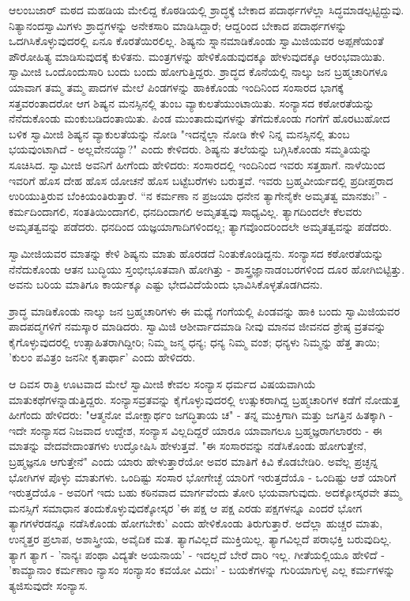ಆಲಂಬಜಾರ್ ಮಠದ ಮಹಡಿಯ ಮೇಲಿದ್ದ ಕೊಠಡಿಯಲ್ಲಿ ಶ್ರಾದ್ಧಕ್ಕೆ ಬೇಕಾದ ಪದಾರ್ಥಗಳೆಲ್ಲಾ ಸಿದ್ಧಮಾಡಲ್ಪಟ್ಟಿದ್ದುವು. ನಿತ್ಯಾನಂದಸ್ವಾಮಿಗಳು ಶ್ರಾದ್ಧಗಳನ್ನು ಅನೇಕಸಾರಿ ಮಾಡಿಸಿದ್ದಾರೆ; ಆದ್ದರಿಂದ ಬೇಕಾದ ಪದಾರ್ಥಗಳನ್ನು ಒದಗಿಸಿಕೊಳ್ಳುವುದರಲ್ಲಿ ಏನೂ ಕೊರತೆಯಿರಲಿಲ್ಲ. ಶಿಷ್ಯನು ಸ್ನಾನಮಾಡಿಕೊಂಡು ಸ್ವಾಮಿಜಿಯವರ ಅಪ್ಪಣೆಯಂತೆ ಪೌರೋಹಿತ್ಯ ಮಾಡಿಸುವುದಕ್ಕೆ ಕುಳಿತನು. ಮಂತ್ರಗಳನ್ನು ಹೇಳಿಕೊಡುವುದಕ್ಕೂ ಹೇಳುವುದಕ್ಕೂ ಆರಂಭವಾಯಿತು. ಸ್ವಾಮೀಜಿ ಒಂದೊಂದುಸಾರಿ ಬಂದು ಬಂದು ಹೋಗುತ್ತಿದ್ದರು. ಶ್ರಾದ್ಧದ ಕೊನೆಯಲ್ಲಿ ನಾಲ್ಕು ಜನ ಬ್ರಹ್ಮಚಾರಿಗಳೂ ಯಾವಾಗ ತಮ್ಮ ತಮ್ಮ ಪಾದಗಳ ಮೇಲೆ ಪಿಂಡಗಳನ್ನು ಹಾಕಿಕೊಂಡು ಇಂದಿನಿಂದ ಸಂಸಾರದ ಭಾಗಕ್ಕೆ ಸತ್ತವರಂತಾದರೋ ಆಗ ಶಿಷ್ಯನ ಮನಸ್ಸಿನಲ್ಲಿ ತುಂಬ ವ್ಯಾಕುಲತೆಯುಂಟಾಯಿತು. ಸಂನ್ಯಾಸದ ಕಠೋರತೆಯನ್ನು ನೆನೆದುಕೊಂಡು ಮಂಕುಬಡಿದಂತಾಯಿತು. ಪಿಂಡ ಮುಂತಾದುವುಗಳನ್ನು ತೆಗೆದುಕೊಂಡು ಗಂಗೆಗೆ ಹೊರಟುಹೋದ ಬಳಿಕ ಸ್ವಾಮೀಜಿ ಶಿಷ್ಯನ ವ್ಯಾಕುಲತೆಯನ್ನು ನೋಡಿ "ಇದನ್ನೆಲ್ಲಾ ನೋಡಿ ಕೇಳಿ ನಿನ್ನ ಮನಸ್ಸಿನಲ್ಲಿ ತುಂಬ ಭಯವುಂಟಾಗಿದೆ - ಅಲ್ಲವೇನಯ್ಯಾ?" ಎಂದು ಕೇಳಿದರು. ಶಿಷ್ಯನು ತಲೆಯನ್ನು ಬಗ್ಗಿಸಿಕೊಂಡು ಸಮ್ಮತಿಯನ್ನು ಸೂಚಿಸಿದ. ಸ್ವಾಮೀಜಿ ಅವನಿಗೆ ಹೀಗೆಂದು ಹೇಳಿದರು: ಸಂಸಾರದಲ್ಲಿ ಇಂದಿನಿಂದ ಇವರು ಸತ್ತಹಾಗೆ. ನಾಳೆಯಿಂದ ಇವರಿಗೆ ಹೊಸ ದೇಹ ಹೊಸ ಯೋಚನೆ ಹೊಸ ಬಟ್ಟೆಬರೆಗಳು ಬರುತ್ತವೆ. ಇವರು ಬ್ರಹ್ಮವೀರ್ಯದಲ್ಲಿ ಪ್ರದೀಪ್ತರಾದ ಉರಿಯುತ್ತಿರುವ ಬೆಂಕಿಯಂತಿರುತ್ತಾರೆ. “ನ ಕರ್ಮಣಾ ನ ಪ್ರಜಯಾ ಧನೇನ ತ್ಯಾಗೇನೈಕೇ ಅಮೃತತ್ವ ಮಾನಶುಃ” - ಕರ್ಮದಿಂದಾಗಲಿ, ಸಂತತಿಯಿಂದಾಗಲಿ, ಧನದಿಂದಾಗಲಿ ಅಮೃತತ್ವವು ಸಾಧ್ಯವಿಲ್ಲ. ತ್ಯಾಗದಿಂದಲೇ ಕೆಲವರು ಅಮೃತತ್ವವನ್ನು ಪಡೆದರು. ಧನದಿಂದ ಯಜ್ಞಯಾಗಾದಿಗಳಿಂದಲ್ಲ; ತ್ಯಾಗವೊಂದರಿಂದಲೇ ಅಮೃತತ್ವವನ್ನು ಪಡೆದರು.

ಸ್ವಾಮೀಜಿಯವರ ಮಾತನ್ನು ಕೇಳಿ ಶಿಷ್ಯನು ಮಾತು ಹೊರಡದೆ ನಿಂತುಕೊಂಡಿದ್ದನು. ಸಂನ್ಯಾಸದ ಕಠೋರತೆಯನ್ನು ನೆನೆದುಕೊಂಡು ಆತನ ಬುದ್ಧಿಯು ಸ್ತಂಭೀಭೂತವಾಗಿ ಹೋಗಿತ್ತು - ಶಾಸ್ತ್ರಜ್ಞಾನಾಡಂಬರಗಳಿಂದ ದೂರ ಹೋಗಿಬಿಟ್ಟಿತ್ತು. ಅವನು ಬರಿಯ ಮಾತಿಗೂ ಕಾರ್ಯಕ್ಕೂ ಎಷ್ಟು ಭೇದವಿದೆಯೆಂದು ಭಾವಿಸಿಕೊಳ್ಳತೊಡಗಿದನು.

ಶ್ರಾದ್ಧ ಮಾಡಿಕೊಂಡು ನಾಲ್ಕು ಜನ ಬ್ರಹ್ಮಚಾರಿಗಳು ಈ ಮಧ್ಯೆ ಗಂಗೆಯಲ್ಲಿ ಪಿಂಡವನ್ನು ಹಾಕಿ ಬಂದು ಸ್ವಾಮಿಜಿಯವರ ಪಾದಪದ್ಮಗಳಿಗೆ ನಮಸ್ಕಾರ ಮಾಡಿದರು. ಸ್ವಾಮಿಜಿ ಆಶೀರ್ವಾದಮಾಡಿ ನೀವು ಮಾನವ ಜೀವನದ ಶ್ರೇಷ್ಠ ವ್ರತವನ್ನು ಕೈಗೊಳ್ಳುವುದರಲ್ಲಿ ಉತ್ಸಾಹಿತರಾಗಿದ್ದೀರಿ; ನಿಮ್ಮ ಜನ್ಮ ಧನ್ಯ; ಧನ್ಯ ನಿಮ್ಮ ವಂಶ; ಧನ್ಯಳು ನಿಮ್ಮನ್ನು ಹೆತ್ತ ತಾಯಿ; 'ಕುಲಂ ಪವಿತ್ರಂ ಜನನೀ ಕೃತಾರ್ಥಾ' ಎಂದು ಹೇಳಿದರು.

ಆ ದಿವಸ ರಾತ್ರಿ ಊಟವಾದ ಮೇಲೆ ಸ್ವಾಮೀಜಿ ಕೇವಲ ಸಂನ್ಯಾಸ ಧರ್ಮದ ವಿಷಯವಾಗಿಯೆ ಮಾತುಕಥೆಗಳನ್ನಾಡುತ್ತಿದ್ದರು. ಸಂನ್ಯಾಸವ್ರತವನ್ನು ಕೈಗೊಳ್ಳುವುದರಲ್ಲಿ ಉತ್ಸುಕರಾಗಿದ್ದ ಬ್ರಹ್ಮಚಾರಿಗಳ ಕಡೆಗೆ ನೋಡುತ್ತ ಹೀಗೆಂದು ಹೇಳಿದರು: "ಆತ್ಮನೋ ಮೋಕ್ಷಾರ್ಥಂ ಜಗದ್ಧಿತಾಯ ಚ" - ತನ್ನ ಮುಕ್ತಿಗಾಗಿ ಮತ್ತು ಜಗತ್ತಿನ ಹಿತಕ್ಕಾಗಿ - ಇದೇ ಸಂನ್ಯಾಸದ ನಿಜವಾದ ಉದ್ದೇಶ, ಸಂನ್ಯಾಸ ವಿಲ್ಲದಿದ್ದರೆ ಯಾರೂ ಯಾವಾಗಲೂ ಬ್ರಹ್ಮಜ್ಞರಾಗಲಾರರು - ಈ ಮಾತನ್ನು ವೇದವೇದಾಂತಗಳು ಉದ್ಘೋಷಿಸಿ ಹೇಳುತ್ತವೆ. "ಈ ಸಂಸಾರವನ್ನು ನಡೆಸಿಕೊಂಡು ಹೋಗುತ್ತೇನೆ, ಬ್ರಹ್ಮಜ್ಞನೂ ಆಗುತ್ತೇನೆ" ಎಂದು ಯಾರು ಹೇಳುತ್ತಾರೆಯೋ ಅವರ ಮಾತಿಗೆ ಕಿವಿ ಕೊಡಬೇಡಿರಿ. ಅವೆಲ್ಲ ಪ್ರಚ್ಛನ್ನ ಭೋಗಿಗಳ ಪೊಳ್ಳು ಮಾತುಗಳು. ಒಂದಿಷ್ಟು ಸಂಸಾರ ಭೋಗೇಚ್ಛೆ ಯಾರಿಗೆ ಇರುತ್ತದೆಯೊ - ಒಂದಿಷ್ಟು ಆಶೆ ಯಾರಿಗೆ ಇರುತ್ತದೆಯೊ - ಅವರಿಗೆ ಇದು ಬಹು ಕಠಿನವಾದ ಮಾರ್ಗವೆಂದು ತೋರಿ ಭಯವಾಗುವುದು. ಅದಕ್ಕೋಸ್ಕರವೇ ತಮ್ಮ ಮನಸ್ಸಿಗೆ ಸಮಾಧಾನ ತಂದುಕೊಳ್ಳುವುದಕ್ಕೋಸ್ಕರ 'ಈ ಪಕ್ಷ ಆ ಪಕ್ಷ ಎರಡು ಪಕ್ಷಗಳನ್ನೂ ಎಂದರೆ ಭೋಗ ತ್ಯಾಗಗಳೆರಡನ್ನೂ ನಡೆಸಿಕೊಂಡು ಹೋಗಬೇಕು' ಎಂದು ಹೇಳಿಕೊಂಡು ತಿರುಗುತ್ತಾರೆ. ಅದೆಲ್ಲಾ ಹುಚ್ಚರ ಮಾತು, ಉನ್ಮತ್ತರ ಪ್ರಲಾಪ, ಅಶಾಸ್ತ್ರೀಯ, ಅವೈದಿಕ ಮತ. ತ್ಯಾಗವಿಲ್ಲದೆ ಮುಕ್ತಿಯಿಲ್ಲ. ತ್ಯಾಗವಿಲ್ಲದೆ ಪರಾಭಕ್ತಿ ಬರುವುದಿಲ್ಲ. ತ್ಯಾಗ ತ್ಯಾಗ - 'ನಾನ್ಯಃ ಪಂಥಾ ವಿದ್ಯತೇ ಅಯನಾಯ' - ಇದಲ್ಲದೆ ಬೇರೆ ದಾರಿ ಇಲ್ಲ. ಗೀತೆಯಲ್ಲಿಯೂ ಹೇಳಿದೆ - 'ಕಾಮ್ಯಾನಾಂ ಕರ್ಮಣಾಂ ನ್ಯಾಸಂ ಸಂನ್ಯಾಸಂ ಕವಯೋ ವಿದುಃ' - ಬಯಕೆಗಳನ್ನು ಗುರಿಯಾಗುಳ್ಳ ಎಲ್ಲ ಕರ್ಮಗಳನ್ನು ತ್ಯಜಿಸುವುದೇ ಸಂನ್ಯಾಸ.

